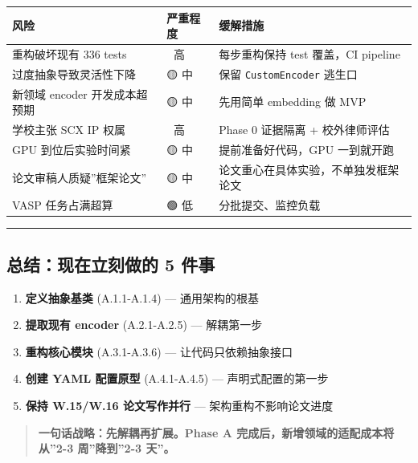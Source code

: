 \documentclass[
  12pt,
]{ctexart}
\providecommand{\tightlist}{%
  \setlength{\itemsep}{0pt}\setlength{\parskip}{0pt}}
\begin{document}
\begin{longtable}[]{@{}
  >{\raggedright\arraybackslash}p{}
  >{\raggedright\arraybackslash}p{}
  >{\raggedright\arraybackslash}p{}@{}}
\toprule\noalign{}
\begin{minipage}[b]{\linewidth}\raggedright
风险
\end{minipage} & \begin{minipage}[b]{\linewidth}\raggedright
严重程度
\end{minipage} & \begin{minipage}[b]{\linewidth}\raggedright
缓解措施
\end{minipage} \\
\midrule\noalign{}
\endhead
\bottomrule\noalign{}
\endlastfoot
重构破坏现有 336 tests & 🔴 高 & 每步重构保持 test 覆盖，CI pipeline \\
过度抽象导致灵活性下降 & 🟡 中 & 保留 \texttt{CustomEncoder} 逃生口 \\
新领域 encoder 开发成本超预期 & 🟡 中 & 先用简单 embedding 做 MVP \\
学校主张 SCX IP 权属 & 🔴 高 & Phase 0 证据隔离 + 校外律师评估 \\
GPU 到位后实验时间紧 & 🟡 中 & 提前准备好代码，GPU 一到就开跑 \\
论文审稿人质疑''框架论文'' & 🟡 中 &
论文重心在具体实验，不单独发框架论文 \\
VASP 任务占满超算 & 🟢 低 & 分批提交、监控负载 \\
\end{longtable}

\begin{center}\rule{0.5\linewidth}{0.5pt}\end{center}

\subsection{总结：现在立刻做的 5
件事}\label{ux603bux7ed3ux73b0ux5728ux7acbux523bux505aux7684-5-ux4ef6ux4e8b}

\begin{enumerate}
\def\labelenumi{\arabic{enumi}.}
\tightlist
\item
  \textbf{定义抽象基类} (A.1.1-A.1.4) --- 通用架构的根基
\item
  \textbf{提取现有 encoder} (A.2.1-A.2.5) --- 解耦第一步
\item
  \textbf{重构核心模块} (A.3.1-A.3.6) --- 让代码只依赖抽象接口
\item
  \textbf{创建 YAML 配置原型} (A.4.1-A.4.5) --- 声明式配置的第一步
\item
  \textbf{保持 W.15/W.16 论文写作并行} --- 架构重构不影响论文进度
\end{enumerate}

\begin{quote}
\textbf{一句话战略：先解耦再扩展。Phase A
完成后，新增领域的适配成本将从''2-3 周''降到''2-3 天''。}
\end{quote}
\end{document}
